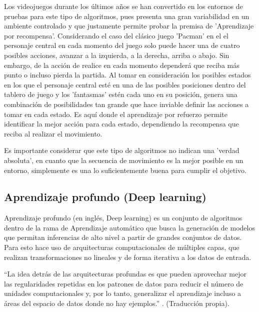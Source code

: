         Los videojuegos durante los últimos años se han convertido en los entornos de pruebas para este tipo de algoritmos, pues presenta una gran variabilidad en un ambiente controlado y que justamente permite probar la premisa de 'Aprendizaje por recompensa'. Considerando el caso del clásico juego 'Pacman' en el el personaje central en cada momento del juego solo puede hacer una de cuatro posibles acciones, avanzar a la izquierda, a la derecha, arriba o abajo. Sin embargo, de la acción de realice en cada momento dependerá que reciba más punto o incluso pierda la partida. Al tomar en consideración los posibles estados en los que el personaje central esté en una de las posibles posiciones dentro del tablero de juego y los 'fantasmas' estén cada uno en su posición, genera una combinación de posibilidades tan grande que hace inviable definir las acciones a tomar en cada estado. Es aquí donde el aprendizaje por refuerzo permite identificar la mejor acción para cada estado, dependiendo la recompensa que reciba al realizar el movimiento. 
        
        Es importante considerar que este tipo de algoritmos no indican una 'verdad absoluta', en cuanto que la secuencia de movimiento es la mejor posible en un entorno, simplemente es una lo suficientemente buena para cumplir el objetivo.
    
    \subsection{Aprendizaje profundo (Deep learning)}
    \label{sub:FrameDeepLearnig}
    
        Aprendizaje profundo (en inglés, Deep learning) es un conjunto de algoritmos dentro de la rama de Aprendizaje automático que busca la generación de modelos que permitan inferencias de alto nivel a partir de grandes conjuntos de datos. Para esto hace uso de arquitecturas computacionales de múltiples capas, que realizan transformaciones no lineales y de forma iterativa a  los datos de entrada.
        
        ``La idea detrás de las arquitecturas profundas es que pueden aprovechar mejor las regularidades repetidas en los patrones de datos para reducir el número de unidades computacionales y, por lo tanto, generalizar el aprendizaje incluso a áreas del espacio de datos donde no hay ejemplos.'' \cite[Pág 34]{Aggarwal2018}. (Traducción propia).\\
        
